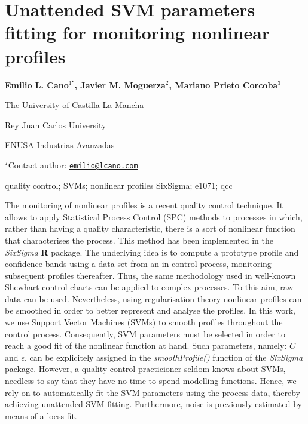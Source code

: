 \documentclass[\main/boa.tex]{subfiles}
\begin{document}
\pagestyle{empty}

\section{Unattended SVM parameters fitting for monitoring nonlinear profiles}

\begin{center}
  {\bf Emilio L. Cano$^{1^\star}$, Javier M. Moguerza$^{2}$, Mariano Prieto Corcoba$^{3}$}
\end{center}

\vskip 0.3cm

\begin{affiliations}
\begin{enumerate}
\begin{minipage}{0.915\textwidth}
\centering
\item The University of Castilla-La Mancha \\[-2pt]
\item Rey Juan Carlos University \\[-2pt]
\item ENUSA Industrias Avanzadas \\[-2pt]
\end{minipage}
\end{enumerate}
$^\star$Contact author: \href{mailto:emilio@lcano.com}{\nolinkurl{emilio@lcano.com}}\\
\end{affiliations}

\vskip 0.5cm

\begin{minipage}{0.915\textwidth}
\keywords quality control; SVMs; nonlinear profiles
\packages SixSigma; e1071; qcc
\end{minipage}

\vskip 0.8cm

The monitoring of nonlinear profiles is a recent quality control
technique. It allows to apply Statistical Process Control (SPC) methods
to processes in which, rather than having a quality characteristic,
there is a sort of nonlinear function that characterises the process.
This method has been implemented in the \emph{SixSigma} \textbf{R}
package. The underlying idea is to compute a prototype profile and
confidence bands using a data set from an in-control process, monitoring
subsequent profiles thereafter. Thus, the same methodology used in
well-known Shewhart control charts can be applied to complex processes.
To this aim, raw data can be used. Nevertheless, using regularisation
theory nonlinear profiles can be smoothed in order to better represent
and analyse the profiles. In this work, we use Support Vector Machines
(SVMs) to smooth profiles throughout the control process. Consequently,
SVM parameters must be selected in order to reach a good fit of the
nonlinear function at hand. Such parameters, namely: \(C\) and
\(\epsilon\), can be explicitely assigned in the \emph{smoothProfile()}
function of the \emph{SixSigma} package. However, a quality control
practicioner seldom knows about SVMs, needless to say that they have no
time to spend modelling functions. Hence, we rely on to automatically
fit the SVM parameters using the process data, thereby achieving
unattended SVM fitting. Furthermore, noise is previously estimated by
means of a loess fit.
\end{document}
